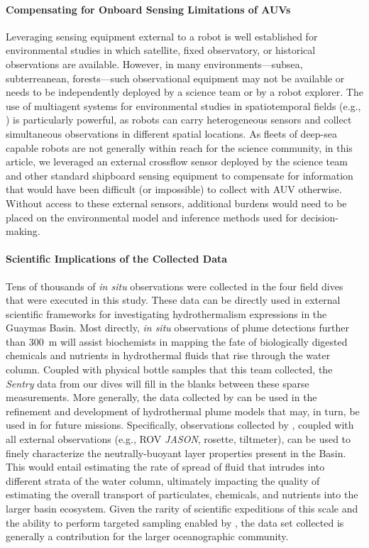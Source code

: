 \paragraph{Compensating for Onboard Sensing Limitations of AUVs}
Leveraging sensing equipment external to a robot is well established for environmental studies in which satellite, fixed observatory, or historical observations are available. However, in many environments---subsea, subterreanean, forests---such observational equipment may not be available or needs to be independently deployed by a science team or by a robot explorer. The use of multiagent systems for environmental studies in spatiotemporal fields (e.g., \autocite{salam2019adaptive,li2014multi,luo2018adaptive,ouyang2014multi}) is particularly powerful, as robots can carry heterogeneous sensors and collect simultaneous observations in different spatial locations. As fleets of deep-sea capable robots are not generally within reach for the science community, in this article, we leveraged an external crossflow sensor deployed by the science team and other standard shipboard sensing equipment to compensate for information that would have been difficult (or impossible) to collect with AUV \Sentry otherwise. Without access to these external sensors, additional burdens would need to be placed on the environmental model and inference methods used for decision-making. 

\paragraph{Scientific Implications of the Collected Data}
Tens of thousands of \emph{in situ} observations were collected in the four field dives that were executed in this study. These data can be directly used in external scientific frameworks for investigating hydrothermalism expressions in the Guaymas Basin. Most directly, \emph{in situ} observations of plume detections further than \SI{300}{\meter} will assist biochemists in mapping the fate of biologically digested chemicals and nutrients in hydrothermal fluids that rise through the water column. Coupled with physical bottle samples that this team collected, the \emph{Sentry} data from our dives will fill in the blanks between these sparse measurements. More generally, the data collected by \Sentry can be used in the refinement and development of hydrothermal plume models that may, in turn, be used in \PHUMES for future missions. Specifically, observations collected by \Sentry, coupled with all external observations (e.g., ROV \emph{JASON}, rosette, tiltmeter), can be used to finely characterize the neutrally-buoyant layer properties present in the Basin. This would entail estimating the rate of spread of fluid that intrudes into different strata of the water column, ultimately impacting the quality of estimating the overall transport of particulates, chemicals, and nutrients into the larger basin ecosystem. Given the rarity of scientific expeditions of this scale and the ability to perform targeted sampling enabled by \PHORTEX, the data set collected is generally a contribution for the larger oceanographic community.   

